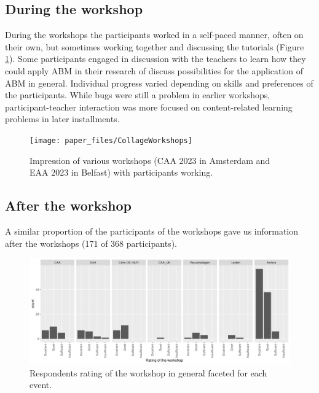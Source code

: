 \documentclass[
]{article}
\begin{document}
\hypertarget{during-the-workshop}{%
\subsection{During the workshop}\label{during-the-workshop}}

During the workshops the participants worked in a self-paced manner, often on their own, but sometimes working together and discussing the tutorials (Figure \ref{fig:workshop-impression}). Some participants engaged in discussion with the teachers to learn how they could apply ABM in their research of discuss possibilities for the application of ABM in general. Individual progress varied depending on skills and preferences of the participants. While bugs were still a problem in earlier workshops, participant-teacher interaction was more focused on content-related learning problems in later installments.

\begin{figure}
\texttt{[image: paper\_files/CollageWorkshops]} \caption{Impression of various workshops (CAA 2023 in Amsterdam and EAA 2023 in Belfast) with participants working.}\label{fig:workshop-impression}
\end{figure}

\hypertarget{after-the-workshop}{%
\subsection{After the workshop}\label{after-the-workshop}}

A similar proportion of the participants of the workshops gave us information after the workshops (171 of 368 participants).

\begin{figure}
\centering
\includegraphics{paper_files/figure-latex/rating-workshop-1.pdf}
\caption{\label{fig:rating-workshop}Respondents rating of the workshop in general faceted for each event.}
\end{figure}
\end{document}
